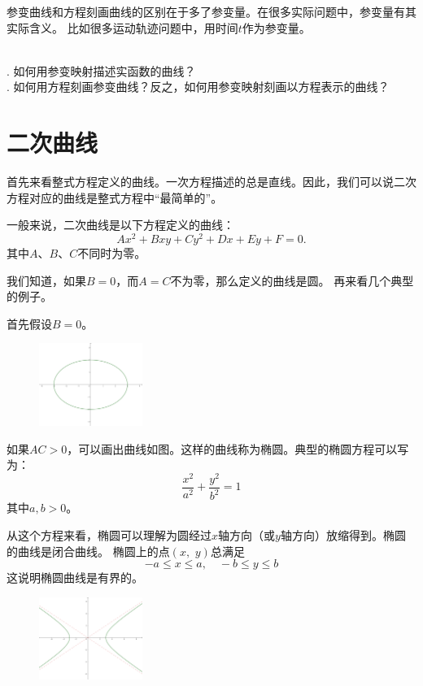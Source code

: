 \documentclass[12pt,UTF8]{ctexbook}
\begin{document}
参变曲线和方程刻画曲线的区别在于多了参变量。在很多实际问题中，参变量有其实际含义。
比如很多运动轨迹问题中，用时间$t$作为参变量。

\begin{sk}
    \mbox{} \\
    . 如何用参变映射描述实函数的曲线？\\
    . 如何用方程刻画参变曲线？反之，如何用参变映射刻画以方程表示的曲线？
\end{sk}

\section{二次曲线}

首先来看整式方程定义的曲线。一次方程描述的总是直线。因此，我们可以说二次方程对应的曲线是整式方程中“最简单的”。

一般来说，二次曲线是以下方程定义的曲线：
$$ Ax^2 + Bxy + Cy^2 + Dx + Ey + F = 0.$$
其中$A$、$B$、$C$不同时为零。

我们知道，如果$B = 0$，而$A = C$不为零，那么定义的曲线是圆。
再来看几个典型的例子。

首先假设$B = 0$。

\begin{figure} %
    \vspace{-30pt}
    \flushright
    \includegraphics[width=0.3\textwidth]{tu/椭圆1.png}
\end{figure}

如果$AC > 0$，可以画出曲线如图。这样的曲线称为椭圆。典型的椭圆方程可以写为：
$$ \frac{x^2}{a^2} + \frac{y^2}{b^2} = 1 $$
其中$a,b>0$。

从这个方程来看，椭圆可以理解为圆经过$x$轴方向（或$y$轴方向）放缩得到。椭圆的曲线是闭合曲线。
椭圆上的点$(x,\,\,y)$总满足
$$ -a \leqslant x \leqslant a, \quad -b \leqslant y \leqslant b$$
这说明椭圆曲线是有界的。

\begin{figure} %
    \vspace{-12pt}
    \flushright
    \includegraphics[width=0.3\textwidth]{tu/双曲线1.png}
\end{figure}
\end{document}
